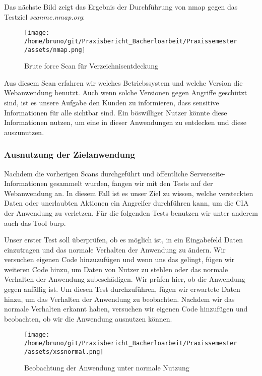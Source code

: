 Das nächste Bild zeigt das Ergebnis der Durchführung von \gls{nmap} gegen das Testziel \textit{scanme.nmap.org}:

\begin{figure}[H]
    \centering
    \texttt{[image: /home/bruno/git/Praxisbericht\_Bacherloarbeit/Praxissemester/assets/nmap.png]}
    \caption{Brute force Scan für Verzeichnisentdeckung}
    \centering
\end{figure}

Aus diesem Scan erfahren wir welches Betriebssystem und welche Version die Webanwendung benutzt. Auch wenn solche Versionen gegen Angriffe geschützt sind, ist es unsere Aufgabe den Kunden zu informieren, dass sensitive Informationen für alle sichtbar sind. Ein böswilliger Nutzer könnte diese Informationen nutzen, um eine  in dieser Anwendungen zu entdecken und diese auszunutzen.

\subsubsection{Ausnutzung der Zielanwendung}

Nachdem die vorherigen Scans durchgeführt und öffentliche Serverseite-Informationen gesammelt wurden, fangen wir mit den Tests auf der Webanwendung an. In diesem Fall ist es unser Ziel zu wissen, welche versteckten Daten oder unerlaubten Aktionen ein Angreifer durchführen kann, um die \gls{CIA} der Anwendung zu verletzen. Für die folgenden Tests benutzen wir unter anderem auch das Tool \gls{burp}.

Unser erster Test soll überprüfen, ob es möglich ist, in ein Eingabefeld Daten einzutragen und das normale Verhalten der Anwendung zu ändern. Wir versuchen eigenen Code hinzuzufügen und wenn uns das gelingt, fügen wir weiteren Code hinzu, um Daten von Nutzer zu stehlen oder das normale Verhalten der Anwendung zubeschädigen. Wir prüfen hier, ob die Anwendung gegen  anfällig ist. Um diesen Test durchzuführen, fügen wir erwartete Daten hinzu, um das Verhalten der Anwendung zu beobachten. Nachdem wir das normale Verhalten erkannt haben, versuchen wir eigenen Code hinzufügen und beobachten, ob wir die Anwendung ausnutzen können. 

\begin{figure}[H]
    \centering
    \texttt{[image: /home/bruno/git/Praxisbericht\_Bacherloarbeit/Praxissemester/assets/xssnormal.png]}
    \caption{Beobachtung der Anwendung unter normale Nutzung}
    \label{fig:xssnormal}
    \centering
\end{figure}

